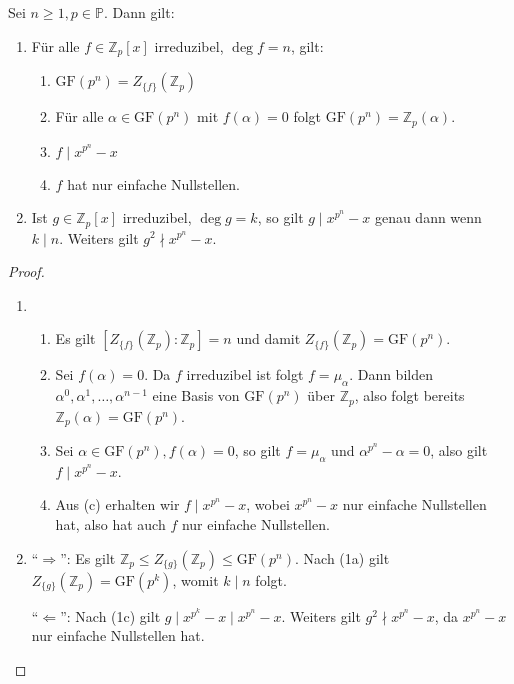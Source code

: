 \begin{lemma}
    Sei $n \geq 1, p \in \mathbb{P}$. Dann gilt:
    \begin{enumerate}
        \item Für alle $f \in \mathbb{Z}_p[x]$ irreduzibel, $\deg f = n$, gilt:
        \begin{enumerate}
            \item $\mathrm{GF}(p^n) = Z_{\{f\}}(\mathbb{Z}_p)$
            \item Für alle $\alpha \in \mathrm{GF}(p^n)$ mit $f(\alpha) = 0$ folgt $\mathrm{GF}(p^n) = \mathbb{Z}_p(\alpha)$.
            \item $f \mid x^{p^n} - x$
            \item $f$ hat nur einfache Nullstellen.
        \end{enumerate}
        \item Ist $g \in \mathbb{Z}_p[x]$ irreduzibel, $\deg g = k$, so gilt $g \mid x^{p^n} - x$ genau dann wenn $k \mid n$. Weiters gilt $g^2 \nmid x^{p^n} - x$.
    \end{enumerate}
\end{lemma}

\begin{proof}{\ }
    \begin{enumerate}
        \item \begin{enumerate}
            \item Es gilt $[Z_{\{f\}}(\mathbb{Z}_p) : \mathbb{Z}_p] = n$ und damit $Z_{\{f\}}(\mathbb{Z}_p) = \mathrm{GF}(p^n)$.
            \item Sei $f(\alpha) = 0$. Da $f$ irreduzibel ist folgt $f = \mu_\alpha$. Dann bilden $\alpha^0, \alpha^1, \hdots, \alpha^{n-1}$ eine Basis von $\mathrm{GF}(p^n)$ über $\mathbb{Z}_p$, also folgt bereits $\mathbb{Z}_p(\alpha) = \mathrm{GF}(p^n)$.
            \item Sei $\alpha \in \mathrm{GF}(p^n), f(\alpha) = 0$, so gilt $f = \mu_\alpha$ und $\alpha^{p^n} - \alpha = 0$, also gilt $f \mid x^{p^n} - x$.
            \item Aus (c) erhalten wir $f \mid x^{p^n} - x$, wobei $x^{p^n} - x$ nur einfache Nullstellen hat, also hat auch $f$ nur einfache Nullstellen.
        \end{enumerate}
        \item ``$\Rightarrow$'': Es gilt $\mathbb{Z}_p \leq Z_{\{g\}}(\mathbb{Z}_p) \leq \mathrm{GF}(p^n)$. Nach (1a) gilt $Z_{\{g\}}(\mathbb{Z}_p) = \mathrm{GF}(p^k)$, womit $k \mid n$ folgt.
        
        ``$\Leftarrow$'': Nach (1c) gilt $g \mid x^{p^k} - x \mid x^{p^n} - x$. Weiters gilt $g^2 \nmid x^{p^n} - x$, da $x^{p^n} - x$ nur einfache Nullstellen hat.
    \end{enumerate}
\end{proof}

